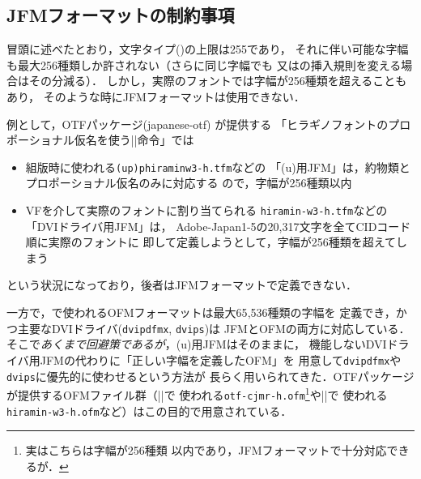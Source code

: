 \documentclass[a4paper,11pt,nomag]{jsarticle}
\def\code#1{\texttt{#1}}
\begin{document}
\subsection{JFMフォーマットの制約事項}

冒頭に述べたとおり，文字タイプ()の上限は255であり，
それに伴い可能な字幅も最大256種類しか許されない（さらに同じ字幅でも
又はの挿入規則を変える場合はその分減る）．
しかし，実際のフォントでは字幅が256種類を超えることもあり，
そのような時にJFMフォーマットは使用できない．

例として，OTFパッケージ(japanese-otf) \cite{jotf}が提供する
「ヒラギノフォントのプロポーショナル仮名を使う|\propshape|命令」では
\begin{itemize}
 \item 組版時に使われる\code{(up)phiraminw3-h.tfm}などの
  「(u)\pTeX 用JFM」は，約物類とプロポーショナル仮名のみに対応する
  ので，字幅が256種類以内
 \item VFを介して実際のフォントに割り当てられる
  \code{hiramin-w3-h.tfm}などの「DVIドライバ用JFM」は，
  Adobe-Japan1-5の20{,}317文字を全てCIDコード順に実際のフォントに
  即して定義しようとして，字幅が256種類を超えてしまう
\end{itemize}
という状況になっており，後者はJFMフォーマットで定義できない．

一方で，\OMEGA で使われるOFMフォーマットは最大65{,}536種類の字幅を
定義でき，かつ主要なDVIドライバ(\code{dvipdfmx}, \code{dvips})は
JFMとOFMの両方に対応している．
そこで\emph{あくまで回避策であるが}，(u)\pTeX 用JFMはそのままに，
機能しないDVIドライバ用JFMの代わりに「正しい字幅を定義したOFM」を
用意して\code{dvipdfmx}や\code{dvips}に優先的に使わせるという方法が
長らく用いられてきた．OTFパッケージが提供するOFMファイル群（|\CID|で
使われる\code{otf-cjmr-h.ofm}\footnote{実はこちらは字幅が256種類
以内であり，JFMフォーマットで十分対応できるが．}や|\propshape|で
使われる\code{hiramin-w3-h.ofm}など）はこの目的で用意されている\cite{cidofm}．
\end{document}
